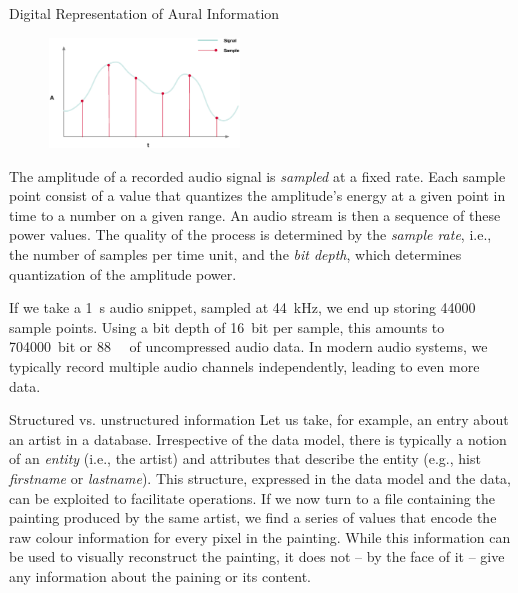 \begin{example}[label=example:representation_audio_information]{Digital Representation of Aural Information}{}
    \begin{figure}
        \includegraphics[width=0.45\textwidth]{figures/example-audio-signal.eps}
    \end{figure}
    The amplitude of a recorded audio signal is \emph{sampled} at a fixed rate. Each sample point consist of a value that quantizes the amplitude's energy at a given point in time to a number on a given range. An audio stream is then a sequence of these power values. The quality of the process is determined by the \emph{sample rate}, i.e., the number of samples per time unit, and the \emph{bit depth}, which determines quantization of the amplitude power.

    If we take a \SI{1}{\second} audio snippet, sampled at \SI{44}{\kilo\hertz}, we end up storing \num{44000} sample points. Using a bit depth of \SI{16}{bit} per sample, this amounts to \SI{704000}{bit} or \SI{88}{\kilo\byte} of uncompressed audio data. In modern audio systems, we typically record multiple audio channels independently, leading to even more data.
\end{example}

\begin{example}[label=example:artist_vs_image]{Structured vs. unstructured information}{}
    Let us take, for example, an entry about an artist in a database. Irrespective of the data model, there is typically a notion of an \emph{entity} (i.e., the artist) and attributes that describe the entity (e.g., hist \emph{firstname} or \emph{lastname}). This structure, expressed in the data model and the data, can be exploited to facilitate operations. If we now turn to a file containing the painting produced by the same artist, we find a series of values that encode the raw colour information for every pixel in the painting. While this information can be used to visually reconstruct the painting, it does not -- by the face of it -- give any information about the paining or its content.
\end{example}



